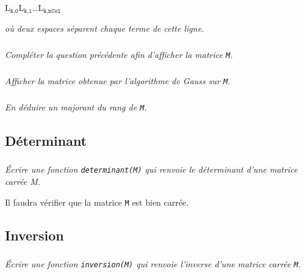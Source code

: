 \documentclass[10pt,oneside]{article}
\begin{document}
\hfil L$_\texttt{k,0}$\qquad L$_\texttt{k,1}$\qquad\ldots\qquad L$_\texttt{k,nCol}$

\textit{où deux espaces séparent chaque terme de cette ligne.}

\subparagraph{}
\textit{Compléter la question précédente afin d'afficher la matrice \texttt{M}.}

\subparagraph{}
\textit{Afficher la matrice obtenue par l'algorithme de Gauss sur \texttt{M}.}

\subparagraph{}
\textit{En déduire un majorant du rang de \texttt{M}.}



\subsection*{Déterminant}

\subparagraph{}
\textit{Écrire une fonction \texttt{determinant(M)} qui renvoie le déterminant d'une matrice carrée M.}

Il faudra vérifier que la matrice \texttt{M} est bien carrée.

\subsection*{Inversion}

\subparagraph{}
\textit{Écrire une fonction \texttt{inversion(M)} qui renvoie l'inverse d'une matrice carrée \texttt{M}.}
\end{document}
